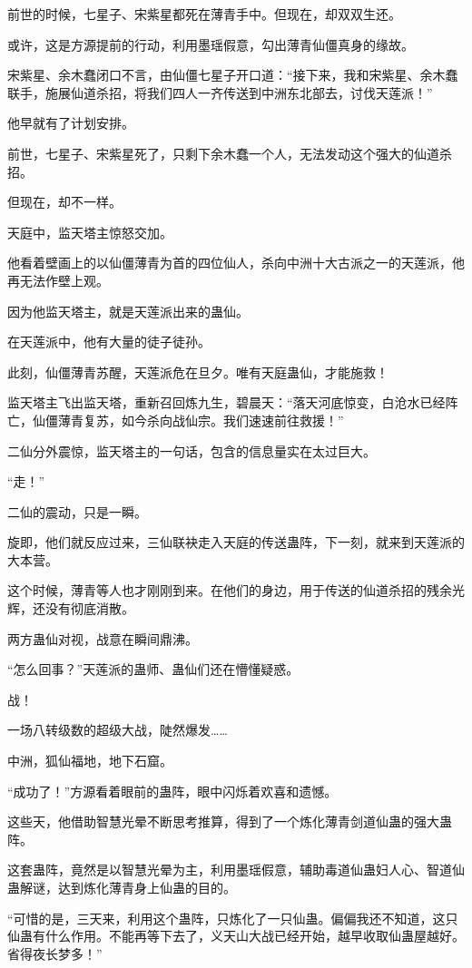 \begin{this_body}
前世的时候，七星子、宋紫星都死在薄青手中。但现在，却双双生还。

或许，这是方源提前的行动，利用墨瑶假意，勾出薄青仙僵真身的缘故。

宋紫星、余木蠢闭口不言，由仙僵七星子开口道：“接下来，我和宋紫星、余木蠢联手，施展仙道杀招，将我们四人一齐传送到中洲东北部去，讨伐天莲派！”

他早就有了计划安排。

前世，七星子、宋紫星死了，只剩下余木蠢一个人，无法发动这个强大的仙道杀招。

但现在，却不一样。

天庭中，监天塔主惊怒交加。

他看着壁画上的以仙僵薄青为首的四位仙人，杀向中洲十大古派之一的天莲派，他再无法作壁上观。

因为他监天塔主，就是天莲派出来的蛊仙。

在天莲派中，他有大量的徒子徒孙。

此刻，仙僵薄青苏醒，天莲派危在旦夕。唯有天庭蛊仙，才能施救！

监天塔主飞出监天塔，重新召回炼九生，碧晨天：“落天河底惊变，白沧水已经阵亡，仙僵薄青复苏，如今杀向战仙宗。我们速速前往救援！”

二仙分外震惊，监天塔主的一句话，包含的信息量实在太过巨大。

“走！”

二仙的震动，只是一瞬。

旋即，他们就反应过来，三仙联袂走入天庭的传送蛊阵，下一刻，就来到天莲派的大本营。

这个时候，薄青等人也才刚刚到来。在他们的身边，用于传送的仙道杀招的残余光辉，还没有彻底消散。

两方蛊仙对视，战意在瞬间鼎沸。

“怎么回事？”天莲派的蛊师、蛊仙们还在懵懂疑惑。

战！

一场八转级数的超级大战，陡然爆发……

中洲，狐仙福地，地下石窟。

“成功了！”方源看着眼前的蛊阵，眼中闪烁着欢喜和遗憾。

这些天，他借助智慧光晕不断思考推算，得到了一个炼化薄青剑道仙蛊的强大蛊阵。

这套蛊阵，竟然是以智慧光晕为主，利用墨瑶假意，辅助毒道仙蛊妇人心、智道仙蛊解谜，达到炼化薄青身上仙蛊的目的。

“可惜的是，三天来，利用这个蛊阵，只炼化了一只仙蛊。偏偏我还不知道，这只仙蛊有什么作用。不能再等下去了，义天山大战已经开始，越早收取仙蛊屋越好。省得夜长梦多！”

\end{this_body}

